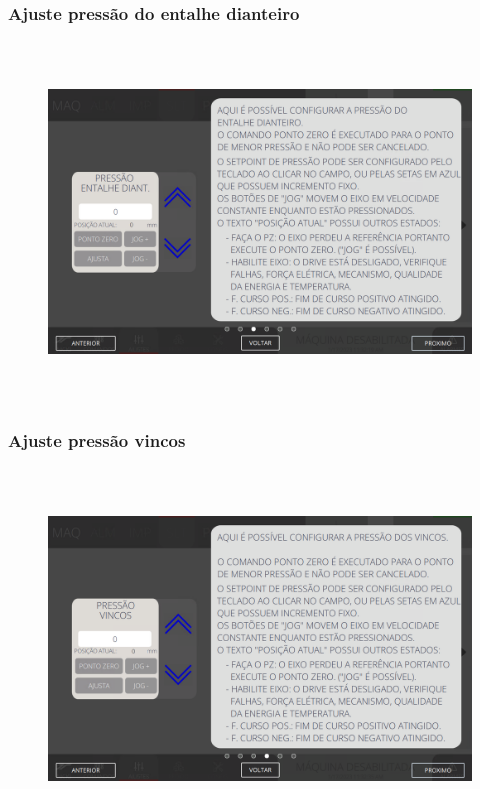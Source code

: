 \newpage
\thispagestyle{fancy}
\vspace*{40 pt}
\subsubsection{\small{Ajuste pressão do entalhe dianteiro}}\label{telaAjustesSlotterAjustePressaoDoEntalheDianteiro}
\vspace*{\fill}
\begin{figure}[h]
  \centering
  \includegraphics[width=576px,height=360px]{src/imagesFlexo/05-slotter/settings/e-3.png}
\end{figure}
\vspace*{\fill}

\newpage
\thispagestyle{fancy}
\vspace*{40 pt}
\subsubsection{\small{Ajuste pressão vincos}}\label{telaAjustesSlotterAjustePressaoVincos}
\vspace*{\fill}
\begin{figure}[h]
  \centering
  \includegraphics[width=576px,height=360px]{src/imagesFlexo/05-slotter/settings/e-4.png}
\end{figure}
\vspace*{\fill}

